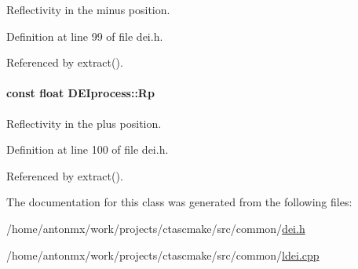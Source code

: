 Reflectivity in the minus position. 



Definition at line 99 of file dei.h.



Referenced by extract().

\hypertarget{classDEIprocess_af2c92e524735fd9632468b8bc3a0023f}{
\paragraph[{Rp}]{\setlength{\rightskip}{0pt plus 5cm}const float {\bf DEIprocess::Rp}}\hfill}
\label{classDEIprocess_af2c92e524735fd9632468b8bc3a0023f}


Reflectivity in the plus position. 



Definition at line 100 of file dei.h.



Referenced by extract().



The documentation for this class was generated from the following files:\begin{DoxyCompactItemize}
\item 
/home/antonmx/work/projects/ctascmake/src/common/\hyperlink{dei_8h}{dei.h}\item 
/home/antonmx/work/projects/ctascmake/src/common/\hyperlink{ldei_8cpp}{ldei.cpp}\end{DoxyCompactItemize}
